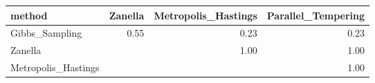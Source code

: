 \begin{table}[ht]
\centering
\begin{tabular}{lrrr}
  \hline
method & Zanella & Metropolis\_Hastings & Parallel\_Tempering \\ 
  \hline
Gibbs\_Sampling & 0.55 & 0.23 & 0.23 \\ 
  Zanella &  & 1.00 & 1.00 \\ 
  Metropolis\_Hastings &  &  & 1.00 \\ 
   \hline
\end{tabular}
\end{table}
